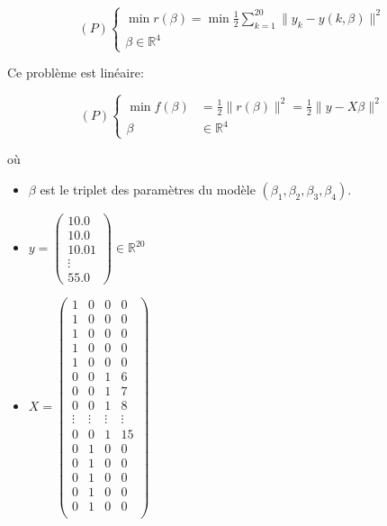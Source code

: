 \documentclass{article}
\begin{document}
\[
	(P) \begin{cases}
		\min r(\beta) = \min \frac{1}{2} \sum_{k=1}^{20} \|y_k - y(k, \beta)\|^2 \\
		\beta \in \mathbb{R}^{4}
	\end{cases}
\] 

Ce problème est linéaire:

\[
	(P) \begin{cases}
		\min f(\beta) &= \frac{1}{2} \|r(\beta)\|^2 = \frac{1}{2} \|y-X\beta\|^2 \\
		\beta &\in \mathbb{R}^4
	\end{cases}
\] 

où

\begin{itemize}
	\item $\beta$ est le triplet des paramètres du modèle $(\beta_1, \beta_2, \beta_3, \beta_4)$.
	\item $y = \begin{pmatrix} 10.0 \\ 10.0 \\ 10.01 \\ \vdots \\ 55.0 \end{pmatrix} \in \mathbb{R}^{20}$
	\item $
			X = \begin{pmatrix} 
				1 & 0 & 0 & 0 \\
				1 & 0 & 0 & 0 \\
				1 & 0 & 0 & 0 \\
				1 & 0 & 0 & 0 \\
				1 & 0 & 0 & 0 \\
				0 & 0 & 1 & 6 \\
				0 & 0 & 1 & 7 \\
				0 & 0 & 1 & 8 \\
				\vdots & \vdots & \vdots & \vdots \\
				0 & 0 & 1 & 15 \\
				0 & 1 & 0 & 0 \\
				0 & 1 & 0 & 0 \\
				0 & 1 & 0 & 0 \\
				0 & 1 & 0 & 0 \\
				0 & 1 & 0 & 0 \\
			\end{pmatrix} 
$
\end{itemize}
\end{document}
